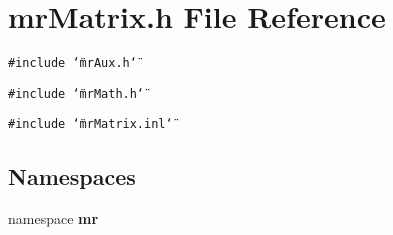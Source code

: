 \section{mr\-Matrix.h File Reference}
\label{mrMatrix_8h}
{\tt \#include \char`\"{}mr\-Aux.h\char`\"{}}\par
{\tt \#include \char`\"{}mr\-Math.h\char`\"{}}\par
{\tt \#include \char`\"{}mr\-Matrix.inl\char`\"{}}\par
\subsection*{Namespaces}
\begin{CompactItemize}
\item 
namespace {\bf mr}
\end{CompactItemize}
